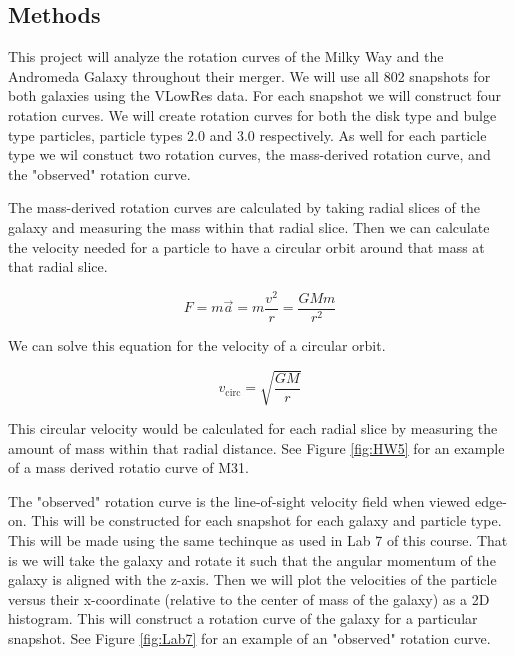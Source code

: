 \documentclass[twocolumn,linenumbers,trackchanges]{aastex7}
\begin{document}
\subsection{Methods}
This project will analyze the rotation curves of the Milky Way and the Andromeda Galaxy throughout their merger. 
We will use all 802 snapshots for both galaxies using the VLowRes data. For each snapshot we will construct four rotation curves.
We will create rotation curves for both the disk type and bulge type particles, particle types 2.0 and 3.0 respectively.
As well for each particle type we wil constuct two rotation curves, the mass-derived rotation curve, and the "observed" rotation curve.

The mass-derived rotation curves are calculated by taking radial slices of the galaxy and measuring the mass within that radial slice. Then we can calculate the velocity needed for a particle to have a circular orbit around that mass at that radial slice.

\begin{equation}
	F=m\overrightarrow{a}=m\frac{v^2}{r}=\frac{GMm}{r^2}
\end{equation}

We can solve this equation for the velocity of a circular orbit.

\begin{equation}
	v_{\text{circ}}=\sqrt{\frac{GM}{r}} \label{eq:vcirc}
\end{equation}

This circular velocity would be calculated for each radial slice by measuring the amount of mass within that radial distance.
See Figure \ref{fig:HW5} for an example of a mass derived rotatio curve of M31.

\begin{figure*}[ht!]
	\caption{Mass-derived rotation curve for M31 at snap number 0. This was made for Homework 5.}
	\label{fig:HW5}
\end{figure*}

The "observed" rotation curve is the line-of-sight velocity field when viewed edge-on. This will be constructed for each snapshot for each galaxy and particle type.
This will be made using the same techinque as used in Lab 7 of this course. 
That is we will take the galaxy and rotate it such that the angular momentum of the galaxy is aligned with the z-axis. 
Then we will plot the velocities of the particle versus their x-coordinate (relative to the center of mass of the galaxy) as a 2D histogram. 
This will construct a rotation curve of the galaxy for a particular snapshot. See Figure \ref{fig:Lab7} for an example of an "observed" rotation curve.
\end{document}

